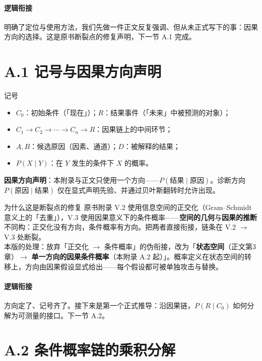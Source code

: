 \documentclass[../../main2.tex]{subfiles}
\begin{document}
	\paragraph*{逻辑衔接}
	明确了定位与使用方法，我们先做一件正文反复强调、但从未正式写下的事：因果方向的选择。这是原书断裂点的修复声明，下一节 A.1 完成。

	\section{A.1 记号与因果方向声明}

	\begin{mathbox}{记号}
		\begin{itemize}
			\item $C_0$：初始条件（「现在」）；$R$：结果事件（「未来」中被预测的对象）；
			\item $C_1 \to C_2 \to \cdots \to C_n \to R$：因果链上的中间环节；
			\item $A, B$：候选原因（因素、通道）；$D$：被解释的结果；
			\item $P(X \mid Y)$：在 $Y$ 发生的条件下 $X$ 的概率。
		\end{itemize}
	\end{mathbox}

	\textbf{因果方向声明}：本附录与正文只使用一个方向——$P(\text{结果} \mid \text{原因})$。诊断方向 $P(\text{原因} \mid \text{结果})$ 仅在显式声明先验、并通过贝叶斯翻转时允许出现。

	\begin{mathbox}{为什么这是断裂点的修复}
		原书附录 V.2 使用信息空间的正交化（Gram--Schmidt 意义上的「去重」），V.3 使用因果意义下的条件概率——\textbf{空间的几何}与\textbf{因果的推断}不同构：正交化没有方向，条件概率有方向。把两者直接衔接，链条在 V.2 $\rightarrow$ V.3 处断裂。\\[0.4em]
		本版的处理：放弃「正交化 $\to$ 条件概率」的伪衔接，改为「\textbf{状态空间}（正文第3章）$\to$ \textbf{单一方向的因果条件概率}（本附录 A.2 起）」。概率定义在状态空间的转移上，方向由因果假设显式给出——每个假设都可被单独攻击与替换。
	\end{mathbox}

	\paragraph*{逻辑衔接}
	方向定了、记号齐了。接下来是第一个正式推导：沿因果链，$P(R \mid C_0)$ 如何分解为可测量的接口。下一节 A.2。

	\section{A.2 条件概率链的乘积分解}
	\label{app:chain}
\end{document}
